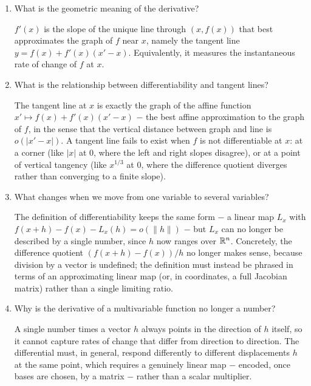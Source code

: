 \documentclass{self-check}
\begin{document}
\begin{enumerate}[leftmargin=*, itemsep=8pt]
\item What is the geometric meaning of the derivative?
\begin{answer}
\(f'(x)\) is the slope of the unique line through \((x,f(x))\) that best approximates the graph of \(f\) near \(x\), namely the tangent line \(y=f(x)+f'(x)(x'-x)\). Equivalently, it measures the instantaneous rate of change of \(f\) at \(x\).
\end{answer}

\item What is the relationship between differentiability and tangent lines?
\begin{answer}
The tangent line at \(x\) is exactly the graph of the affine function \(x'\mapsto f(x)+f'(x)(x'-x)\) \(-\) the best affine approximation to the graph of \(f\), in the sense that the vertical distance between graph and line is \(o(|x'-x|)\). A tangent line fails to exist when \(f\) is not differentiable at \(x\): at a corner (like \(|x|\) at \(0\), where the left and right slopes disagree), or at a point of vertical tangency (like \(x^{1/3}\) at \(0\), where the difference quotient diverges rather than converging to a finite slope).
\end{answer}

\item What changes when we move from one variable to several variables?
\begin{answer}
The definition of differentiability keeps the same form \(-\) a linear map \(L_x\) with \(f(x+h)-f(x)-L_x(h)=o(\|h\|)\) \(-\) but \(L_x\) can no longer be described by a single number, since \(h\) now ranges over \(\mathbb{R}^n\). Concretely, the difference quotient \((f(x+h)-f(x))/h\) no longer makes sense, because division by a vector is undefined; the definition must instead be phrased in terms of an approximating linear map (or, in coordinates, a full Jacobian matrix) rather than a single limiting ratio.
\end{answer}

\item Why is the derivative of a multivariable function no longer a number?
\begin{answer}
A single number times a vector \(h\) always points in the direction of \(h\) itself, so it cannot capture rates of change that differ from direction to direction. The differential must, in general, respond differently to different displacements \(h\) at the same point, which requires a genuinely linear map \(-\) encoded, once bases are chosen, by a matrix \(-\) rather than a scalar multiplier.
\end{answer}


\end{enumerate}
\end{document}
